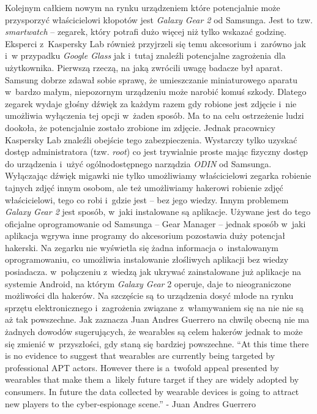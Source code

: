 \documentclass{xmgr}
\begin{document}
	Kolejnym całkiem nowym na rynku urządzeniem które potencjalnie może przysporzyć właścicielowi kłopotów jest \emph{Galaxy Gear 2} od Samsunga. Jest to tzw. \emph{smartwatch} – zegarek, który potrafi dużo więcej niż tylko wskazać godzinę. Eksperci z~Kaspersky Lab również przyjrzeli się temu akcesorium i~zarówno jak i~w przypadku \emph{Google Glass} jak i~tutaj znaleźli potencjalne zagrożenia dla użytkownika. Pierwszą rzeczą, na jaką zwrócili uwagę badacze był aparat. Samsung dobrze zdawał sobie sprawę, że umieszczanie miniaturowego aparatu w~bardzo małym, niepozornym urządzeniu może narobić komuś szkody. Dlatego zegarek wydaje głośny dźwięk za każdym razem gdy robione jest zdjęcie i~nie umożliwia wyłączenia tej opcji w~żaden sposób. Ma to na celu ostrzeżenie ludzi dookoła, że potencjalnie zostało zrobione im zdjęcie. Jednak pracownicy Kaspersky Lab znaleźli obejście tego zabezpieczenia. Wystarczy tylko uzyskać dostęp administratora (tzw. \emph{root}) co jest trywialnie proste mając fizyczny dostęp do urządzenia i~użyć ogólnodostępnego narządzia \emph{ODIN} od Samsunga. Wyłączając dźwięk migawki nie tylko umożliwiamy właścicielowi zegarka robienie tajnych zdjęć innym osobom, ale też umożliwiamy hakerowi robienie zdjęć właścicielowi, tego co robi i~gdzie jest – bez jego wiedzy.
	Innym problemem \emph{Galaxy Gear 2} jest sposób, w~jaki instalowane są aplikacje. Używane jest do tego oficjalne oprogramowanie od Samsunga – Gear Manager – jednak sposób w~jaki aplikacja wgrywa inne programy do akcesorium pozostawia duży potencjał hakerski. Na zegarku nie wyświetla się żadna informacja o~instalowanym oprogramowaniu, co umożliwia instalowanie złośliwych aplikacji bez wiedzy posiadacza. w~połączeniu z~wiedzą jak ukrywać zainstalowane już aplikacje na systemie Android, na którym \emph{Galaxy Gear} 2 operuje, daje to nieograniczone możliwości dla hakerów.
	Na szczęście są to urządzenia dosyć młode na rynku sprzętu elektronicznego i~zagrożenia związane z~włamywaniem się na nie nie są aż tak powszechne. Jak zaznacza Juan Andres Guerrero na chwilę obecną nie ma żadnych dowodów sugerujących, że wearables są celem hakerów jednak to może się zmienić w~przyszłości, gdy staną się bardziej powszechne.
	“At this time there is no evidence to suggest that wearables are currently being targeted by professional APT actors. However there is a~twofold appeal presented by wearables that make them a~likely future target if they are widely adopted by consumers.  In future the data collected by wearable devices is going to attract new players to the cyber-espionage scene.” -  Juan Andres Guerrero
\end{document}
